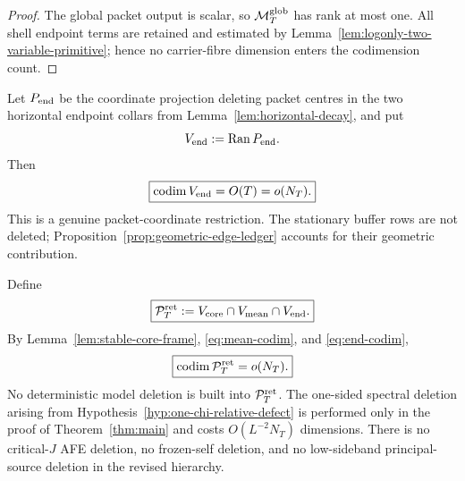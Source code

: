 \begin{proof}
The global packet output is scalar, so $\mathcal M_T^{\rm glob}$ has rank at
most one.  All shell endpoint terms are retained and estimated by
Lemma~\ref{lem:logonly-two-variable-primitive}; hence no carrier-fibre
dimension enters the codimension count.
\end{proof}

Let $P_{\rm end}$ be the coordinate projection deleting packet centres in the
two horizontal endpoint collars from Lemma~\ref{lem:horizontal-decay}, and put
\begin{equation}
V_{\rm end}:=\operatorname{Ran} P_{\rm end}.
\label{eq:end-space}
\end{equation}
Then
\begin{equation}
\boxed{\operatorname{codim} V_{\rm end}=O(T)=o(N_T).}
\label{eq:end-codim}
\end{equation}
This is a genuine packet-coordinate restriction.  The stationary buffer rows
are not deleted; Proposition~\ref{prop:geometric-edge-ledger} accounts for
their geometric contribution.

Define
\begin{equation}
\boxed{
\mathcal P_T^{\rm ret}:=V_{\rm core}\cap V_{\rm mean}\cap V_{\rm end}.
}
\label{eq:retained-space}
\end{equation}
By Lemma~\ref{lem:stable-core-frame}, \eqref{eq:mean-codim}, and
\eqref{eq:end-codim},
\begin{equation}
\boxed{\operatorname{codim}\mathcal P_T^{\rm ret}=o(N_T).}
\label{eq:retained-codim}
\end{equation}
No deterministic model deletion is built into $\mathcal P_T^{\rm ret}$.  The one-sided spectral
deletion arising from Hypothesis~\ref{hyp:one-chi-relative-defect} is performed
only in the proof of Theorem~\ref{thm:main} and costs
$O(L^{-2}N_T)$ dimensions.  There is no critical-$J$ AFE deletion, no
frozen-self deletion, and no low-sideband principal-source deletion in the
revised hierarchy.
